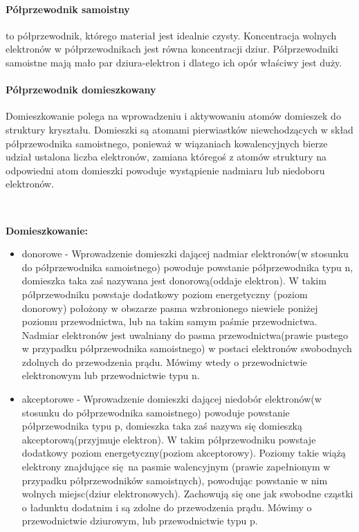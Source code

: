 \documentclass{article}
\begin{document}
            \paragraph{Półprzewodnik samoistny}
            to półprzewodnik, którego materiał jest idealnie czysty.
            Koncentracja wolnych elektronów w półprzewodnikach jest równa
            koncentracji dziur. Półprzewodniki samoistne mają mało par
            dziura-elektron i dlatego ich opór właściwy jest duży.

            \paragraph{Półprzewodnik domieszkowany}
            Domieszkowanie polega na wprowadzeniu i aktywowaniu atomów
            domieszek do struktury kryształu. Domieszki są atomami pierwiastków
            niewchodzących w skład półprzewodnika samoistnego, ponieważ
            w wiązaniach kowalencyjnych bierze udział ustalona liczba elektronów,
            zamiana któregoś z atomów struktury na odpowiedni atom domieszki
            powoduje wystąpienie nadmiaru lub niedoboru elektronów.


            \
            
            \textbf{Domieszkowanie: }
            \begin{itemize}
                \item donorowe - Wprowadzenie domieszki dającej nadmiar
                elektronów(w stosunku do półprzewodnika samoistnego)
                powoduje powstanie półprzewodnika typu n, domieszka taka
                zaś nazywana jest donorową(oddaje elektron).
                W takim półprzewodniku powstaje dodatkowy poziom energetyczny
                (poziom donorowy) położony w obszarze pasma wzbronionego niewiele
                poniżej poziomu przewodnictwa, lub na takim samym paśmie przewodnictwa.
                Nadmiar elektronów jest uwalniany do pasma przewodnictwa(prawie pustego
                w przypadku półprzewodnika samoistnego) w postaci elektronów swobodnych
                zdolnych do przewodzenia prądu. Mówimy wtedy o przewodnictwie
                elektronowym lub przewodnictwie typu n.

                \item akceptorowe - Wprowadzenie domieszki dającej niedobór
                elektronów(w stosunku do półprzewodnika samoistnego) powoduje
                powstanie półprzewodnika typu p, domieszka taka zaś nazywa się
                domieszką akceptorową(przyjmuje elektron). W takim półprzewodniku
                powstaje dodatkowy poziom energetyczny(poziom akceptorowy).
                Poziomy takie wiążą elektrony znajdujące się na pasmie walencyjnym
                (prawie zapełnionym w przypadku półprzewodników samoistnych),
                powodując powstanie w nim wolnych miejsc(dziur elektronowych).
                Zachowują się one jak swobodne cząstki o ładunktu dodatnim i są
                zdolne do przewodzenia prądu. Mówimy o przewodnictwie dziurowym,
                lub przewodnictwie typu p.
            \end{itemize}
\end{document}
